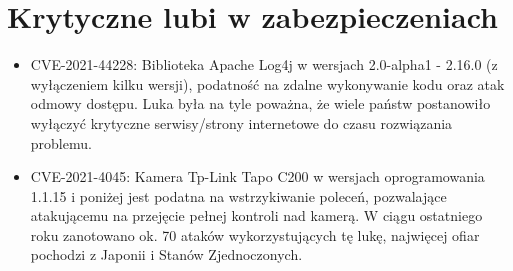 \documentclass{article}
\begin{document}
\section*{Krytyczne lubi w zabezpieczeniach}
\begin{itemize}
  \item CVE-2021-44228: Biblioteka Apache Log4j w wersjach 2.0-alpha1 - 2.16.0 (z wyłączeniem kilku wersji), podatność na zdalne wykonywanie kodu oraz atak odmowy dostępu. Luka była na tyle poważna, że wiele państw postanowiło wyłączyć krytyczne serwisy/strony internetowe do czasu rozwiązania problemu.
  \item CVE-2021-4045: Kamera Tp-Link Tapo C200 w wersjach oprogramowania 1.1.15 i poniżej jest podatna na wstrzykiwanie poleceń, pozwalające atakującemu na przejęcie pełnej kontroli nad kamerą. W ciągu ostatniego roku zanotowano ok. 70 ataków wykorzystujących tę lukę, najwięcej ofiar pochodzi z Japonii i Stanów Zjednoczonych.
\end{itemize}
\end{document}
